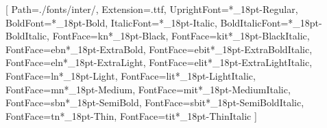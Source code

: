 
\setmainfont{Inter}[
    Path=./fonts/inter/,
    Extension=.ttf,
    UprightFont=*_18pt-Regular,
    BoldFont=*_18pt-Bold,
    ItalicFont=*_18pt-Italic,
    BoldItalicFont=*_18pt-BoldItalic,
    FontFace={k}{n}{*_18pt-Black},
    FontFace={k}{it}{*_18pt-BlackItalic},
    FontFace={eb}{n}{*_18pt-ExtraBold},
    FontFace={eb}{it}{*_18pt-ExtraBoldItalic},
    FontFace={el}{n}{*_18pt-ExtraLight},
    FontFace={el}{it}{*_18pt-ExtraLightItalic},
    FontFace={l}{n}{*_18pt-Light},
    FontFace={l}{it}{*_18pt-LightItalic},
    FontFace={m}{n}{*_18pt-Medium},
    FontFace={m}{it}{*_18pt-MediumItalic},
    FontFace={sb}{n}{*_18pt-SemiBold},
    FontFace={sb}{it}{*_18pt-SemiBoldItalic},
    FontFace={t}{n}{*_18pt-Thin},
    FontFace={t}{it}{*_18pt-ThinItalic}
]
